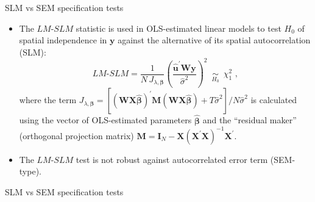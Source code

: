 \documentclass{beamer}
\begin{document}
\begin{frame}{SLM vs SEM specification tests}
\begin{itemize}
    \item The $\textit{LM-SLM}$ statistic is used in OLS-estimated linear models to test $H_0$ of spatial independence in $\bm{y}$ against the alternative of its spatial autocorrelation (SLM): 
\begin{equation*} 
\textit{LM-SLM}=\frac{1}{N \, J_{\lambda,\bm{\beta}}}
\left(\frac{\bm{\hat{u}}^{'}\bm{Wy}}{\hat{\sigma}^2}\right)^{2} 
\,\,\, \underset{H_0}{\sim} \,\,\, \chi_1^2 \,\,,
\end{equation*}
where the term $J_{\lambda,\bm{\beta}} = \left[ (\bm{WX\hat{\beta}})^{'}\bm{M}(\bm{WX\hat{\beta}}) + T \hat{\sigma}^2 \right] \! / N \hat{\sigma}^2$ is calculated using the vector of OLS-estimated parameters $\bm{\hat{\beta}}$ and the ``residual maker'' (orthogonal projection matrix) $\bm{M} = \bm{I}_N - \bm{X}(\bm{X}^{'}\bm{X})^{-1}\bm{X}^{'}$.
\smallskip
\item The $\textit{LM-SLM}$ test is not robust against autocorrelated error term (SEM-type).
\end{itemize}
\end{frame}
\begin{frame}{SLM vs SEM specification tests}
\end{frame}
\end{document}
